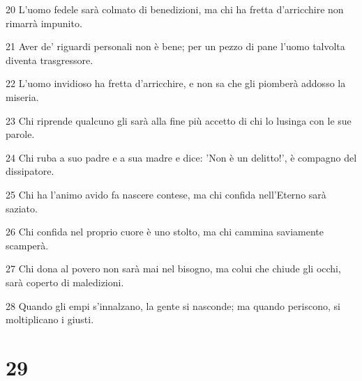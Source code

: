 \par 20 L'uomo fedele sarà colmato di benedizioni, ma chi ha fretta d'arricchire non rimarrà impunito.
\par 21 Aver de' riguardi personali non è bene; per un pezzo di pane l'uomo talvolta diventa trasgressore.
\par 22 L'uomo invidioso ha fretta d'arricchire, e non sa che gli piomberà addosso la miseria.
\par 23 Chi riprende qualcuno gli sarà alla fine più accetto di chi lo lusinga con le sue parole.
\par 24 Chi ruba a suo padre e a sua madre e dice: 'Non è un delitto!', è compagno del dissipatore.
\par 25 Chi ha l'animo avido fa nascere contese, ma chi confida nell'Eterno sarà saziato.
\par 26 Chi confida nel proprio cuore è uno stolto, ma chi cammina saviamente scamperà.
\par 27 Chi dona al povero non sarà mai nel bisogno, ma colui che chiude gli occhi, sarà coperto di maledizioni.
\par 28 Quando gli empi s'innalzano, la gente si nasconde; ma quando periscono, si moltiplicano i giusti.

\chapter{29}

